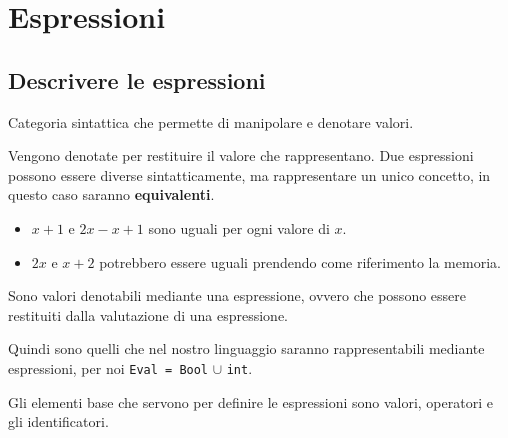 \documentclass[oneside,a4paper,11pt]{book}
\theoremstyle{italicstyle}
\theoremstyle{normStyle}
\begin{document}
\chapter{Espressioni}
\section{Descrivere le espressioni}
\begin{tcolorbox}[title={Espressioni}]
Categoria sintattica che permette di manipolare e denotare valori.
\end{tcolorbox}
Vengono denotate per restituire il valore che rappresentano.
Due espressioni possono essere diverse sintatticamente, ma rappresentare 
un unico concetto, in questo caso saranno \textbf{equivalenti}.
\begin{itemize}
  \item $x + 1$ e $2x - x + 1$ sono uguali per ogni valore di $x$.
  \item $2x$ e $x + 2$ potrebbero essere uguali prendendo come riferimento 
  la memoria.
\end{itemize}
\begin{tcolorbox}[title={Valori esprimibili}]
Sono valori denotabili mediante una espressione, ovvero
che possono essere restituiti dalla valutazione di una espressione.
\end{tcolorbox}
Quindi sono quelli che nel nostro linguaggio saranno rappresentabili mediante espressioni,
per noi \verb|Eval = Bool| $\cup$ \verb|int|.

Gli elementi base che servono per definire le espressioni sono valori, operatori e 
gli identificatori.
\end{document}
